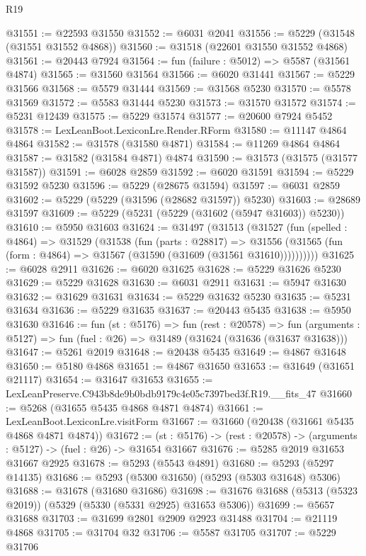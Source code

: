 \begin{lexlean}{R19}
\begin{coremodule}
@31551 := @22593 @31550
@31552 := @6031 @2041
@31556 := @5229 (@31548 (@31551 @31552 @4868))
@31560 := @31518 (@22601 @31550 @31552 @4868)
@31561 := @20443 @7924
@31564 := fun (failure : @5012) => @5587 (@31561 @4874)
@31565 := @31560 @31564
@31566 := @6020 @31441
@31567 := @5229 @31566
@31568 := @5579 @31444
@31569 := @31568 @5230
@31570 := @5578 @31569
@31572 := @5583 @31444 @5230
@31573 := @31570 @31572
@31574 := @5231 @12439
@31575 := @5229 @31574
@31577 := @20600 @7924 @5452
@31578 := LexLeanBoot.LexiconLre.Render.RForm
@31580 := @11147 @4864 @4864
@31582 := @31578 (@31580 @4871)
@31584 := @11269 @4864 @4864
@31587 := @31582 (@31584 @4871) @4874
@31590 := @31573 (@31575 (@31577 @31587))
@31591 := @6028 @2859
@31592 := @6020 @31591
@31594 := @5229 @31592 @5230
@31596 := @5229 (@28675 @31594)
@31597 := @6031 @2859
@31602 := @5229 (@5229 (@31596 (@28682 @31597)) @5230)
@31603 := @28689 @31597
@31609 := @5229 (@5231 (@5229 (@31602 (@5947 @31603)) @5230))
@31610 := @5950 @31603
@31624 := @31497
    (@31513
      (@31527
        (fun (spelled : @4864) =>
        @31529
          (@31538
            (fun (parts : @28817) =>
            @31556 (@31565 (fun (form : @4864) => @31567 (@31590 (@31609 (@31561 @31610))))))))))
@31625 := @6028 @2911
@31626 := @6020 @31625
@31628 := @5229 @31626 @5230
@31629 := @5229 @31628
@31630 := @6031 @2911
@31631 := @5947 @31630
@31632 := @31629 @31631
@31634 := @5229 @31632 @5230
@31635 := @5231 @31634
@31636 := @5229 @31635
@31637 := @20443 @5435
@31638 := @5950 @31630
@31646 := fun (st : @5176) =>
  fun (rest : @20578) =>
  fun (arguments : @5127) => fun (fuel : @26) => @31489 (@31624 (@31636 (@31637 @31638)))
@31647 := @5261 @2019
@31648 := @20438 @5435
@31649 := @4867 @31648
@31650 := @5180 @4868
@31651 := @4867 @31650
@31653 := @31649 (@31651 @21117)
@31654 := @31647 @31653
@31655 := LexLeanPreserve.C943b8de9b0bdb9179c4e05c7397bed3f.R19.__fits_47
@31660 := @5268 (@31655 @5435 @4868 @4871 @4874)
@31661 := LexLeanBoot.LexiconLre.visitForm
@31667 := @31660 (@20438 (@31661 @5435 @4868 @4871 @4874))
@31672 := (st : @5176) -> (rest : @20578) -> (arguments : @5127) -> (fuel : @26) -> @31654 @31667
@31676 := @5285 @2019 @31653 @31667 @2925
@31678 := @5293 (@5543 @4891)
@31680 := @5293 (@5297 @14135)
@31686 := @5293 (@5300 @31650) (@5293 (@5303 @31648) @5306)
@31688 := @31678 (@31680 @31686)
@31698 := @31676 @31688 (@5313 (@5323 @2019)) (@5329 (@5330 (@5331 @2925) @31653 @5306))
@31699 := @5657 @31688
@31703 := @31699 @2801 @2909 @2923 @31488
@31704 := @21119 @4868
@31705 := @31704 @32
@31706 := @5587 @31705
@31707 := @5229 @31706

\end{coremodule}
\end{lexlean}

